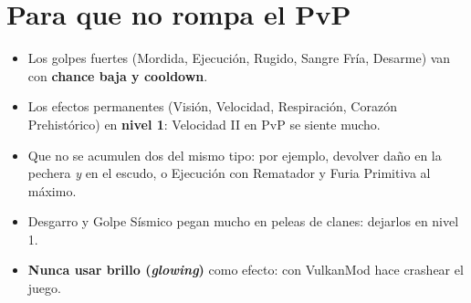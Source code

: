 \documentclass[11pt,a4paper]{article}
\begin{document}
\section{Para que no rompa el PvP}
\begin{itemize}[leftmargin=*]
  \item Los golpes fuertes (Mordida, Ejecución, Rugido, Sangre Fría, Desarme) van con \textbf{chance baja y cooldown}.
  \item Los efectos permanentes (Visión, Velocidad, Respiración, Corazón Prehistórico) en \textbf{nivel 1}: Velocidad II en PvP se siente mucho.
  \item Que no se acumulen dos del mismo tipo: por ejemplo, devolver daño en la pechera \emph{y} en el escudo, o Ejecución con Rematador y Furia Primitiva al máximo.
  \item Desgarro y Golpe Sísmico pegan mucho en peleas de clanes: dejarlos en nivel 1.
  \item \textbf{Nunca usar brillo (\emph{glowing})} como efecto: con VulkanMod hace crashear el juego.
\end{itemize}
\end{document}
